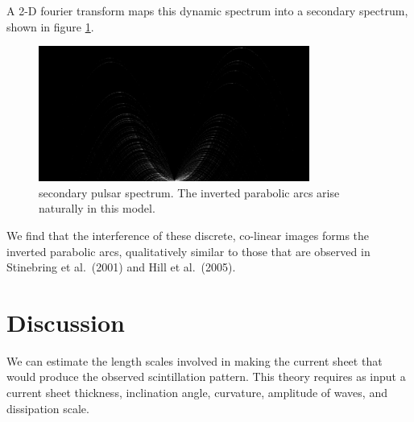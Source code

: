\documentclass[useAMS,usenatbib]{mn2e}
\begin{document}
A 2-D fourier transform maps this dynamic spectrum into a secondary
spectrum, shown in figure \ref{fig:ss}.

\begin{figure}
\centerline{\includegraphics[width=3.5in]{sspect.jpg}}
\caption{secondary pulsar spectrum.  The inverted parabolic arcs arise
naturally in this model.}
\label{fig:ss}
\end{figure}

We find that the interference of these discrete, co-linear images
forms the inverted parabolic arcs, qualitatively similar to those that are observed in
Stinebring et al.~(2001) and Hill et al.~(2005).



\section{Discussion}

We can estimate the length scales involved in making the current sheet that
would produce the observed scintillation pattern.  This theory requires as
input a current sheet thickness, inclination angle, curvature,
amplitude of waves, and dissipation scale.
\end{document}
